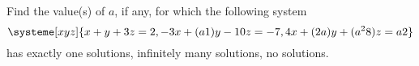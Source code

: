 
\begin{Exercise}[name={},
title={}, 
origin={\cite{KA}},
counter=Exercise]
Find the value(s) of $a$, if any, for which the following system
$$
\systeme[xyz]{x+y+3z=2, -3x+ (a\-1)y -10z=-7, 4x+ (2\-a)y+ (a^2\-8)z =a\-2}
$$
has
\Question exactly one solutions,
\Question infinitely many solutions,
\Question no solutions.
\end{Exercise}

\begin{Answer}
\Question 
\Question 
\Question 
\end{Answer}

